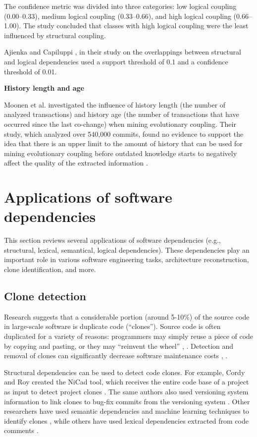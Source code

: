 The confidence metric was divided into three categories: low logical coupling (0.00–0.33), medium logical coupling (0.33–0.66), and high logical coupling (0.66–1.00). The study concluded that classes with high logical coupling were the least influenced by structural coupling.

Ajienka and Capiluppi \cite{DBLP:journals/ese/AjienkaCC18}, in their study on the overlappings between structural and logical dependencies used a support threshold of 0.1 and a confidence threshold of 0.01.



\textbf{History length and age}

Moonen et al. investigated the influence of history length (the number of analyzed transactions) and history age (the number of transactions that have occurred since the last co-change) when mining evolutionary coupling. Their study, which analyzed over 540,000 commits, found no evidence to support the idea that there is an upper limit to the amount of history that can be used for mining evolutionary coupling before outdated knowledge starts to negatively affect the quality of the extracted information \cite{article-Moonen}.


\section{Applications of software dependencies}
\label{app}

\hspace{4em}This section reviews several applications of software dependencies (e.g., structural, lexical, semantical, logical dependencies). These dependencies play an important role in various software engineering tasks, architecture reconstruction, clone identification, and more. 


\subsection{Clone detection}
Research suggests that a considerable portion (around 5-10\%) of the source code in large-scale software is duplicate code (“clones”). Source code is often duplicated for a variety of reasons: programmers may simply reuse a piece of code by copying and pasting, or they may “reinvent the wheel” \cite{ClonesMayrand}, \cite{clones}. Detection and removal of clones can significantly decrease software maintenance costs \cite{CloneDetection}, \cite{cloneKamiya}.

Structural dependencies can be used to detect code clones. For example, Cordy and Roy created the NiCad tool, which receives the entire code base of a project as input to detect project clones \cite{clones-nicad}. The same authors also used versioning system information to link clones to bug-fix commits from the versioning system \cite{clones-nicad-git}. Other researchers have used semantic dependencies and machine learning techniques to identify clones \cite{clones-ml}, while others have used lexical dependencies extracted from code comments \cite{clones-comments}.


